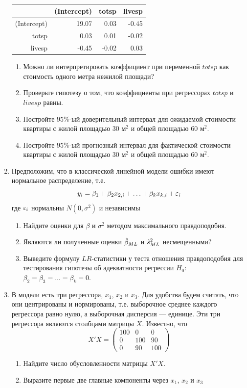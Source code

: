 \documentclass[12pt, a4paper]{article}
\begin{document}
\begin{enumerate}
\begin{tabular}{rrrr}
  \hline
 & (Intercept) & totsp & livesp \\
  \hline
(Intercept) & 19.07 & 0.03 & -0.45 \\
  totsp & 0.03 & 0.01 & -0.02 \\
  livesp & -0.45 & -0.02 & 0.03 \\
   \hline
\end{tabular}


\begin{enumerate}
\item Можно ли интерпретировать коэффициент при переменной $totsp$ как стоимость одного метра нежилой площади?
\item Проверьте гипотезу о том, что коэффициенты при регрессорах $totsp$ и $livesp$ равны.
\item Постройте 95\%-ый доверительный интервал для ожидаемой стоимости квартиры с жилой площадью $30$ м$^2$ и общей площадью $60$ м$^2$.
\item Постройте 95\%-ый прогнозный интервал для фактической стоимости квартиры с жилой площадью $30$ м$^2$ и общей площадью $60$ м$^2$.
\end{enumerate}


\item Предположим, что в классической линейной модели ошибки имеют нормальное распределение, т.е.
\[
y_i=\beta_1+\beta_2 x_{2,i}+\ldots+\beta_k x_{k,i}+\varepsilon_i
\]
где $\varepsilon_i$ нормальны $N(0,\sigma^2)$ и независимы
\begin{enumerate}
\item Найдите оценки для $\beta$ и $\sigma^2$ методом максимального правдоподобия.
\item Являются ли полученные оценки $\hat{\beta}_{ML}$ и $\hat{s}^2_{ML}$ несмещенными?
\item Выведите формулу $LR$-статистики у теста отношения правдоподобия для тестирования гипотезы об адекватности регрессии $H_0$: $\beta_2=\beta_3=\ldots=\beta_k=0$.
\end{enumerate}


\item В модели есть три регрессора, $x_1$, $x_2$ и $x_3$. Для удобства будем считать, что они центрированы и нормированы, т.е. выборочное среднее каждого регрессора равно нулю, а выборочная дисперсия — единице. Эти три регрессора являются столбцами матрицы $X$. Известно, что
\[
X'X=\left(\begin{array}{ccc}
100 & 0 & 0 \\
0 & 100 & 90 \\
0 & 90 & 100
\end{array}\right)
\]
\begin{enumerate}
\item Найдите число обусловленности матрицы $X'X$.
\item Выразите первые две главные компоненты через $x_1$, $x_2$ и $x_3$
\end{enumerate}


\end{enumerate}
\end{document}

